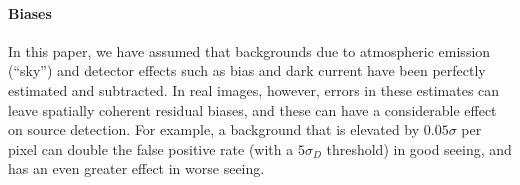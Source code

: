 \documentclass[11pt,letterpaper,linenumbers]{aastex7}
\newcommand{\psf}{\psi}
\newcommand{\sigd}{\sigma_{\scriptscriptstyle D}}
\begin{document}
\paragraph{Biases}
In this paper, we have assumed that backgrounds due to atmospheric
emission (``sky'') and detector effects such as bias and dark current
have been perfectly estimated and subtracted.  In real images,
however, errors in these estimates can leave spatially coherent
residual biases, and these can have a considerable effect on source
detection.  For example, a background that is elevated by $0.05
\sigma$ per pixel can double the false positive rate (with a
$5\sigd$ threshold) in good seeing, and has an even greater effect
in worse seeing.


%









\end{document}
